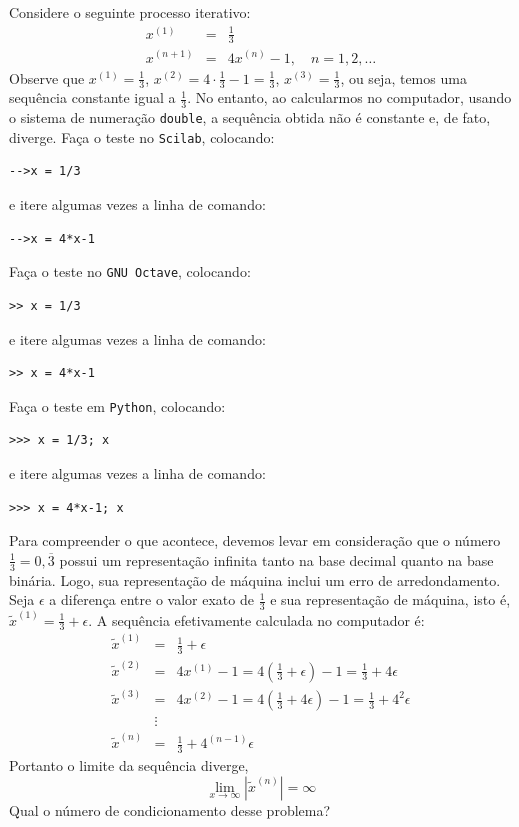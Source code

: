 \begin{ex} Considere o seguinte processo iterativo:
  \begin{eqnarray}
    x^{(1)} &=& \frac{1}{3}\\
    x^{(n+1)} &=& 4x^{(n)}-1,\quad n=1, 2, \ldots
  \end{eqnarray}
Observe que $x^{(1)}=\frac{1}{3}$, $x^{(2)}=4\cdot \frac{1}{3}-1=\frac{1}{3}$, $x^{(3)}=\frac{1}{3}$, ou seja, temos uma sequência constante igual a $\frac{1}{3}$. No entanto, ao calcularmos no computador, usando o sistema de numeração \verb+double+, a sequência obtida não é constante e, de fato, diverge.
\ifisscilab
Faça o teste no \verb+Scilab+, colocando:
\begin{verbatim}
-->x = 1/3
\end{verbatim}
e itere algumas vezes a linha de comando:
\begin{verbatim}
-->x = 4*x-1
\end{verbatim}
\fi
\ifisoctave
Faça o teste no \verb+GNU Octave+, colocando:
\begin{verbatim}
>> x = 1/3
\end{verbatim}
e itere algumas vezes a linha de comando:
\begin{verbatim}
>> x = 4*x-1
\end{verbatim}
\fi
\ifispython
Faça o teste em \verb+Python+, colocando:
\begin{verbatim}
>>> x = 1/3; x
\end{verbatim}
e itere algumas vezes a linha de comando:
\begin{verbatim}
>>> x = 4*x-1; x
\end{verbatim}
\fi

Para compreender o que acontece, devemos levar em consideração que o número $\frac{1}{3}=0,\overline{3}$ possui um representação infinita tanto na base decimal quanto na base binária. Logo, sua representação de máquina inclui um erro de arredondamento. Seja $\epsilon$ a diferença entre o valor exato de $\frac{1}{3}$ e sua representação de máquina, isto é, $\tilde{x}^{(1)}=\frac{1}{3}+\epsilon$. A sequência efetivamente calculada no computador é:
\begin{eqnarray}
\tilde{x}^{(1)}&=&\frac{1}{3}+\epsilon\\
\tilde{x}^{(2)}&=&4x^{(1)}-1=4\left(\frac{1}{3}+\epsilon\right)-1=\frac{1}{3}+4\epsilon\\
\tilde{x}^{(3)}&=&4x^{(2)}-1=4\left(\frac{1}{3}+4\epsilon\right)-1=\frac{1}{3}+4^2\epsilon\\
&\vdots&\\
\tilde{x}^{(n)}&=&\frac{1}{3}+4^{(n-1)}\epsilon
\end{eqnarray}
Portanto o limite da sequência diverge,
\begin{equation}
\lim_{x\to\infty}|\tilde{x}^{(n)}|=\infty
\end{equation}
Qual o número de condicionamento desse problema?
\end{ex}


